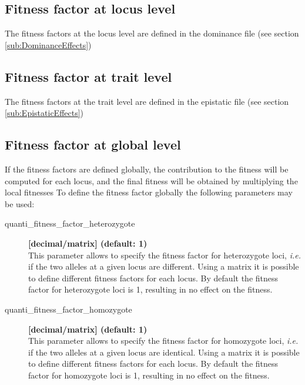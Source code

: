 \documentclass[letterpaper,12pt,oneside]{book}
\begin{document}
\subsection{Fitness factor at locus level}
The fitness factors at the locus level are defined in the dominance file (see section \ref{sub:DominanceEffects})
\subsection{Fitness factor at trait level}
The fitness factors at the trait level are defined in the epistatic file (see section \ref{sub:EpistaticEffects})
\subsection{Fitness factor at global level}
If the fitness factors are defined globally, the contribution to the fitness will be computed for each locus, and the final fitness will be obtained by multiplying the local fitnesses  To define the fitness factor globally the following parameters may be used:
    
\begin{description}
\item[quanti\_fitness\_factor\_heterozygote] \textbf{[decimal/matrix] (default: 1)}\\
This parameter allows to specify the fitness factor for heterozygote loci, \textit{i.e.} if the two alleles at a given locus are different. Using a matrix it is possible to define different fitness factors for each locus. By default the fitness factor for heterozygote loci is 1, resulting in no effect on the fitness. 

\item[quanti\_fitness\_factor\_homozygote] \textbf{[decimal/matrix] (default: 1)}\\
This parameter allows to specify the fitness factor for homozygote loci, \textit{i.e.} if the two alleles at a given locus are identical. Using a matrix it is possible to define different fitness factors for each locus. By default the fitness factor for homozygote loci is 1, resulting in no effect on the fitness. 

\end{description}


\newpage
\end{document}
